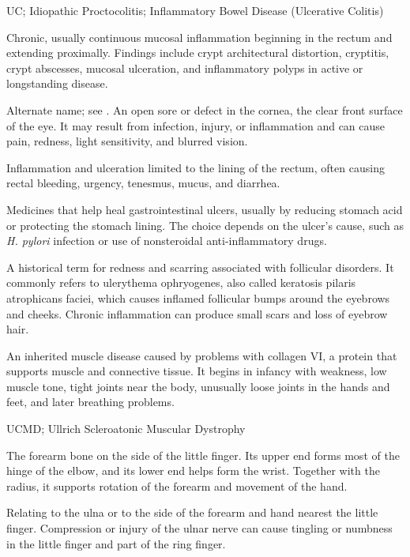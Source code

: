 \synonyms
UC; Idiopathic Proctocolitis; Inflammatory Bowel Disease (Ulcerative Colitis)

 Chronic, usually continuous mucosal inflammation beginning in the rectum and extending proximally. Findings include crypt architectural distortion, cryptitis, crypt abscesses, mucosal ulceration, and inflammatory polyps in active or longstanding disease.

 Alternate name; see .
 An open sore or defect in the cornea, the clear front surface of the eye. It may result from infection, injury, or inflammation and can cause pain, redness, light sensitivity, and blurred vision.

 Inflammation and ulceration limited to the lining of the rectum, often causing rectal bleeding, urgency, tenesmus, mucus, and diarrhea.


 Medicines that help heal gastrointestinal ulcers, usually by reducing stomach acid or protecting the stomach lining. The choice depends on the ulcer's cause, such as \textit{H. pylori} infection or use of nonsteroidal anti-inflammatory drugs.

 A historical term for redness and scarring associated with follicular disorders.
It commonly refers to ulerythema ophryogenes, also called keratosis pilaris atrophicans faciei,
which causes inflamed follicular bumps around the eyebrows and cheeks. Chronic inflammation
can produce small scars and loss of eyebrow hair.

 An inherited muscle disease caused by problems with collagen VI, a protein that supports muscle and connective tissue. It begins in infancy with weakness, low muscle tone, tight joints near the body, unusually loose joints in the hands and feet, and later breathing problems.

\synonyms
UCMD; Ullrich Scleroatonic Muscular Dystrophy

 The forearm bone on the side of the little finger. Its upper end forms most of the hinge of the elbow, and its lower end helps form the wrist. Together with the radius, it supports rotation of the forearm and movement of the hand.

 Relating to the ulna or to the side of the forearm and hand nearest the little finger. Compression or injury of the ulnar nerve can cause tingling or numbness in the little finger and part of the ring finger.

